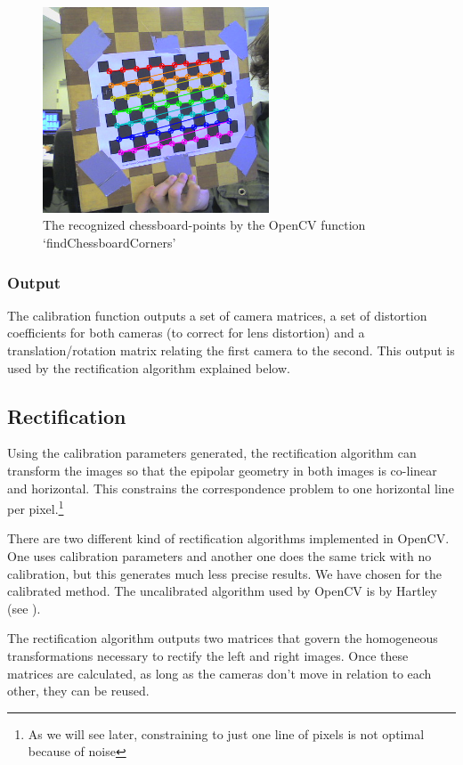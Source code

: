 \documentclass[a4paper]{article}
\begin{document}
\begin{figure} [h!tb]
\centering
  \includegraphics[width=0.6\textwidth]{chessboardcorners}
  \caption{The recognized chessboard-points by the OpenCV function
`findChessboardCorners'\label{chessboardcorners}}
\end{figure}

\subsubsection{Output} The calibration function outputs a set of
camera matrices, a set of distortion coefficients for both cameras (to
correct for lens distortion) and a translation/rotation matrix
relating the first camera to the second. This output is used by the
rectification algorithm explained below.

\subsection{Rectification} Using the calibration parameters generated,
the rectification algorithm can transform the images so that the
epipolar geometry in both images is co-linear and horizontal. This
constrains the correspondence problem to one horizontal line per
pixel.\footnote{As we will see later, constraining to just one line of
pixels is not optimal because of noise}

There are two different kind of rectification algorithms implemented
in OpenCV. One uses calibration parameters and another one does the
same trick with no calibration, but this generates much less precise
results. We have chosen for the calibrated method. The uncalibrated
algorithm used by OpenCV is by Hartley (see \cite{Hartley99}).

The rectification algorithm outputs two matrices that govern the
homogeneous transformations necessary to rectify the left and right
images. Once these matrices are calculated, as long as the cameras
don't move in relation to each other, they can be reused.
\end{document}
